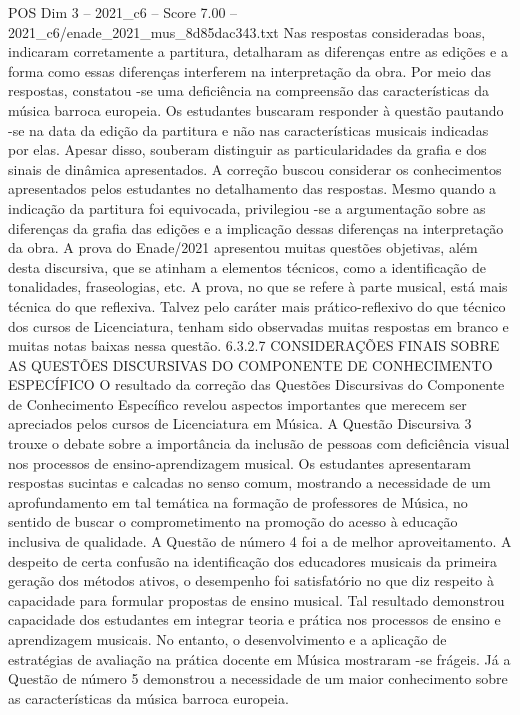\begin{textsample}{POS Dim 3 – 2021\_c6 – Score 7.00 – 2021\_c6/enade\_2021\_mus\_8d85dac343.txt}
Nas respostas consideradas boas, indicaram corretamente a partitura, detalharam as diferenças entre as edições e a forma como essas diferenças interferem na interpretação da obra.
Por meio das respostas, constatou -se uma deficiência na compreensão das características da música barroca europeia.
Os estudantes buscaram responder à questão pautando -se na data da edição da partitura e não nas características musicais indicadas por elas.
Apesar disso, souberam distinguir as particularidades da grafia e dos sinais de dinâmica apresentados.
A correção buscou considerar os conhecimentos apresentados pelos estudantes no detalhamento das respostas.
Mesmo quando a indicação da partitura foi equivocada, privilegiou -se a argumentação sobre as diferenças da grafia das edições e a implicação dessas diferenças na interpretação da obra.
A prova do Enade/2021 apresentou muitas questões objetivas, além desta discursiva, que se atinham a elementos técnicos, como a identificação de tonalidades, fraseologias, etc.
A prova, no que se refere à parte musical, está mais técnica do que reflexiva.
Talvez pelo caráter mais prático-reflexivo do que técnico dos cursos de Licenciatura, tenham sido observadas muitas respostas em branco e muitas notas baixas nessa questão. 6.3.2.7 CONSIDERAÇÕES FINAIS SOBRE AS QUESTÕES DISCURSIVAS DO COMPONENTE DE CONHECIMENTO ESPECÍFICO O resultado da correção das Questões Discursivas do Componente de Conhecimento Específico revelou aspectos importantes que merecem ser apreciados pelos cursos de Licenciatura em Música.
A Questão Discursiva 3 trouxe o debate sobre a importância da inclusão de pessoas com deficiência visual nos processos de ensino-aprendizagem musical.
Os estudantes apresentaram respostas sucintas e calcadas no senso comum, mostrando a necessidade de um aprofundamento em tal temática na formação de professores de Música, no sentido de buscar o comprometimento na promoção do acesso à educação inclusiva de qualidade.
A Questão de número 4 foi a de melhor aproveitamento.
A despeito de certa confusão na identificação dos educadores musicais da primeira geração dos métodos ativos, o desempenho foi satisfatório no que diz respeito à capacidade para formular propostas de ensino musical.
Tal resultado demonstrou capacidade dos estudantes em integrar teoria e prática nos processos de ensino e aprendizagem musicais.
No entanto, o desenvolvimento e a aplicação de estratégias de avaliação na prática docente em Música mostraram -se frágeis.
Já a Questão de número 5 demonstrou a necessidade de um maior conhecimento sobre as características da música barroca europeia.

\end{textsample}
